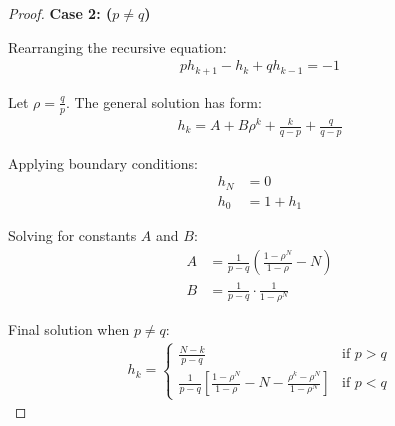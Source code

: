 \documentclass[letterpaper, 11pt]{article}
\newcommand{\1}{\mathds{1}}	%
\theoremstyle{definition}
\begin{document}
\begin{proof}
\textbf{Case 2: ($p \neq q$)}

Rearranging the recursive equation:
\begin{align*}
ph_{k+1} - h_k + qh_{k-1} = -1
\end{align*}

Let $\rho = \frac{q}{p}$. The general solution has form:
\begin{align*}
h_k = A + B\rho^k + \frac{k}{q-p} + \frac{q}{q-p}
\end{align*}

Applying boundary conditions:
\begin{align*}
h_N &= 0\\
h_0 &= 1 + h_1
\end{align*}

Solving for constants $A$ and $B$:
\begin{align*}
A &= \frac{1}{p-q}\left(\frac{1-\rho^N}{1-\rho} - N\right)\\
B &= \frac{1}{p-q} \cdot \frac{1}{1-\rho^N}
\end{align*}

Final solution when $p \neq q$:
\begin{align*}
h_k = \begin{cases}
\frac{N-k}{p-q} & \text{if } p > q\\
\frac{1}{p-q}\left[\frac{1-\rho^N}{1-\rho} - N - \frac{\rho^k-\rho^N}{1-\rho^N}\right] & \text{if } p < q
\end{cases}
\end{align*}
    \end{proof}
\end{document}

